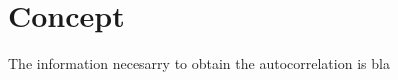 \documentclass[a4paper, openany, oneside]{memoir}
\begin{document}
\section{Concept}
The information necesarry to obtain the autocorrelation is bla 
\end{document}
